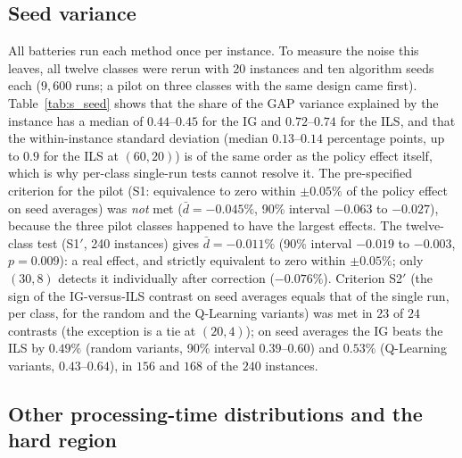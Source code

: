 \documentclass[final,3p,times,11pt,authoryear]{elsarticle}
\begin{document}
\subsection{Seed variance}
\label{sec:seedvar}

All batteries run each method once per instance. To measure the noise this
leaves, all twelve classes were rerun with 20 instances and ten algorithm seeds
each ($9{,}600$ runs; a pilot on three classes with the same design came first).
Table~\ref{tab:s_seed} shows that the share of the GAP variance explained by the
instance has a median of $0.44$--$0.45$ for the IG and $0.72$--$0.74$ for the
ILS, and that the within-instance standard deviation (median $0.13$--$0.14$
percentage points, up to $0.9$ for the ILS at $(60,20)$) is of the same order as
the policy effect itself, which is why per-class single-run tests cannot resolve
it. The pre-specified criterion for the pilot (S1: equivalence to zero within
$\pm0.05\%$ of the policy effect on seed averages) was \emph{not} met
($\bar d=-0.045\%$, 90\% interval $-0.063$ to $-0.027$), because the three
pilot classes happened to have the largest effects. The twelve-class test (S1$'$,
240 instances) gives $\bar d=-0.011\%$ (90\% interval $-0.019$ to $-0.003$,
$p=0.009$): a real effect, and strictly equivalent to zero within $\pm0.05\%$;
only $(30,8)$ detects it individually after correction ($-0.076\%$). Criterion
S2$'$ (the sign of the IG-versus-ILS contrast on seed averages equals that of the
single run, per class, for the random and the Q-Learning variants) was met in
$23$ of $24$ contrasts (the exception is a tie at $(20,4)$); on seed averages the
IG beats the ILS by $0.49\%$ (random variants, 90\% interval $0.39$--$0.60$) and
$0.53\%$ (Q-Learning variants, $0.43$--$0.64$), in $156$ and $168$ of the $240$
instances.



\subsection{Other processing-time distributions and the hard region}
\label{sec:newdist}
\end{document}
